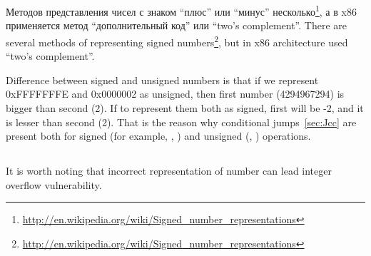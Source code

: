 ﻿%

\section{\SignedNumbersSectionName}
\label{sec:signednumbers}

\newcommand{\URLS}{\url{http://en.wikipedia.org/wiki/Signed_number_representations}}

\IFRU
{Методов представления чисел с знаком ``плюс'' или ``минус'' несколько\footnote{\URLS}, 
а в x86 применяется метод ``дополнительный код'' или ``two's complement''.}
{There are several methods of representing signed numbers\footnote{\URLS}, 
but in x86 architecture used ``two's complement''.}

{Difference between signed and unsigned numbers is that if we represent 0xFFFFFFFE and 0x0000002 
as unsigned, then first number (4294967294) is bigger than second (2). 
If to represent them both as signed, first will be -2, and it is lesser than second (2). 
That is the reason why conditional jumps~\ref{sec:Jcc} are present both for signed (for example, \JG, \JL) 
and unsigned (\JA, \JB) operations.}

\subsection{}

{It is worth noting that incorrect representation of number can lead integer overflow vulnerability.}

